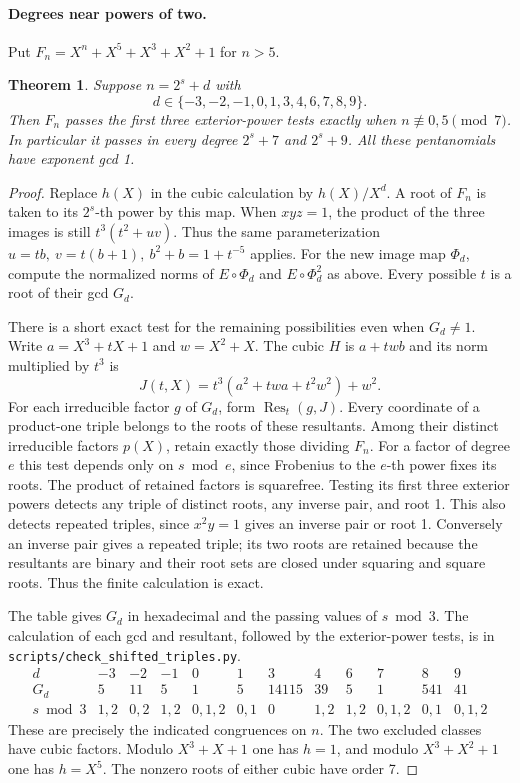 \documentclass[11pt]{article}
\newtheorem{theorem}{Theorem}
\begin{document}
\paragraph{Degrees near powers of two.}
Put \(F_n=X^n+X^5+X^3+X^2+1\) for \(n>5\).
\begin{theorem}\label{thm:shifted-triples}
Suppose \(n=2^s+d\) with
\[
 d\in\{-3,-2,-1,0,1,3,4,6,7,8,9\}.
\]
Then \(F_n\) passes the first three exterior-power tests exactly when
\(n\not\equiv0,5\pmod7\). In particular it passes in every degree
\(2^s+7\) and \(2^s+9\). All these pentanomials have exponent gcd 1.
\end{theorem}
\begin{proof}
Replace \(h(X)\) in the cubic calculation by \(h(X)/X^d\).
A root of \(F_n\) is taken to its \(2^s\)-th power by this map.
When \(xyz=1\), the product of the three images is still
\(t^3(t^2+uv)\). Thus the same parameterization
\(u=tb,\ v=t(b+1),\ b^2+b=1+t^{-5}\) applies.
For the new image map \(\Phi_d\), compute the normalized norms of
\(E\circ\Phi_d\) and \(E\circ\Phi_d^2\) as above.
Every possible \(t\) is a root of their gcd \(G_d\).

There is a short exact test for the remaining possibilities even when
\(G_d\ne1\). Write \(a=X^3+tX+1\) and \(w=X^2+X\). The cubic
\(H\) is \(a+twb\) and its norm multiplied by \(t^3\) is
\[
           J(t,X)=t^3(a^2+twa+t^2w^2)+w^2.
\]
For each irreducible factor \(g\) of \(G_d\), form
\(\operatorname{Res}_t(g,J)\). Every coordinate of a product-one
triple belongs to the roots of these resultants. Among their distinct
irreducible factors \(p(X)\), retain exactly those dividing \(F_n\).
For a factor of degree \(e\) this test depends only on \(s\bmod e\),
since Frobenius to the \(e\)-th power fixes its roots.
The product of retained factors is squarefree. Testing its first three
exterior powers detects any triple of distinct roots, any inverse
pair, and root 1. This also detects repeated triples, since
\(x^2y=1\) gives an inverse pair or root 1. Conversely an inverse
pair gives a repeated triple; its two roots are retained because
the resultants are binary and their root sets are closed under
squaring and square roots. Thus the finite calculation is exact.

The table gives \(G_d\) in hexadecimal and the passing values of
\(s\bmod3\). The calculation of each gcd and resultant, followed by the
exterior-power tests, is in \texttt{scripts/check\_shifted\_triples.py}.
\[
\begin{array}{r|rrrrrrrrrrr}
d&-3&-2&-1&0&1&3&4&6&7&8&9\\ \hline
G_d &5&11&5&1&5&14115&39&5&1&541&41\\
s\bmod3&1,2&0,2&1,2&0,1,2&0,1&0&1,2&1,2&0,1,2&0,1&0,1,2
\end{array}
\]
These are precisely the indicated congruences on \(n\).
The two excluded classes have cubic factors. Modulo \(X^3+X+1\)
one has \(h=1\), and modulo \(X^3+X^2+1\) one has \(h=X^5\).
The nonzero roots of either cubic have order 7.
\end{proof}
\end{document}
